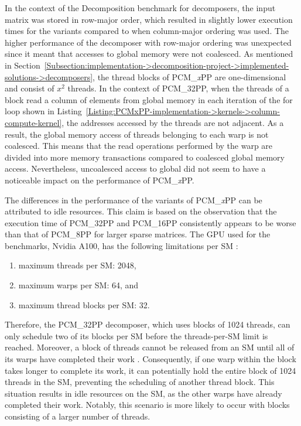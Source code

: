 In the context of the Decomposition benchmark for decomposers, the input matrix was stored in row-major order, which resulted in slightly lower execution times for the variants compared to when column-major ordering was used. The higher performance of the decomposer with row-major ordering was unexpected since it meant that accesses to global memory were not coalesced. As mentioned in Section~\ref{Subsection:implementation->decomposition-project->implemented-solutions->decomposers}, the thread blocks of PCM\_\textit{x}PP are one-dimensional and consist of $x^2$ threads. In the context of PCM\_32PP, when the threads of a block read a column of elements from global memory in each iteration of the for loop shown in Listing~\ref{Listing:PCMxPP-implementation->kernels->column-compute-kernel}, the addresses accessed by the threads are not adjacent. As a result, the global memory access of threads belonging to each warp is not coalesced. This means that the read operations performed by the warp are divided into more memory transactions compared to coalesced global memory access. Nevertheless, uncoalesced access to global did not seem to have a noticeable impact on the performance of PCM\_\textit{x}PP.

The differences in the performance of the variants of PCM\_\textit{x}PP can be attributed to idle resources. This claim is based on the observation that the execution time of PCM\_32PP and PCM\_16PP consistently appears to be worse than that of PCM\_8PP for larger sparse matrices. The GPU used for the benchmarks, Nvidia A100, has the following limitations per SM \cite{rfiOEXAGDlcAOxF3}:

\begin{enumerate}
	\itemsep=0em %
	\item maximum threads per SM: 2048,
	\item maximum warps per SM: 64, and
	\item maximum thread blocks per SM: 32.
\end{enumerate}

Therefore, the PCM\_32PP decomposer, which uses blocks of 1024 threads, can only schedule two of its blocks per SM before the threads-per-SM limit is reached. Moreover, a block of threads cannot be released from an SM until all of its warps have completed their work \cite{Cheng2014}. Consequently, if one warp within the block takes longer to complete its work, it can potentially hold the entire block of 1024 threads in the SM, preventing the scheduling of another thread block. This situation results in idle resources on the SM, as the other warps have already completed their work. Notably, this scenario is more likely to occur with blocks consisting of a larger number of threads.

